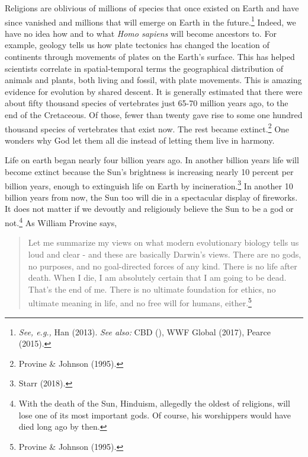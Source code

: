 \begin{multicols}{2}
Religions are oblivious of millions of species that once existed on Earth and have since vanished and millions that will emerge on Earth in the future.\footnote{\textit{See, e.g.,} Han (2013). \textit{See also:} CBD (), WWF Global (2017), Pearce (2015).} Indeed, we have no idea how and to what \textit{Homo sapiens} will become ancestors to. For example, geology tells us how plate tectonics has changed the location of continents through movements of plates on the Earth's surface. This has helped scientists correlate in spatial-temporal terms the geographical distribution of animals and plants, both living and fossil, with plate movements. This is amazing evidence for evolution by shared descent. It is generally estimated that there were about fifty thousand species of vertebrates just 65-70 million years ago, to the end of the Cretaceous. Of those, fewer than twenty gave rise to some one hundred thousand species of vertebrates that exist now. The rest became extinct.\footnote{Provine \& Johnson (1995).}  One wonders why God let them all die instead of letting them live in harmony.

Life on earth began nearly four billion years ago. In another billion years life will become extinct because the Sun's brightness is increasing nearly 10 percent per billion years, enough to extinguish life on Earth by incineration.\footnote{Starr (2018).} In another 10 billion years from now, the Sun too will die in a spectacular display of fireworks. It does not matter if we devoutly and religiously believe the Sun to be a god or not.\footnote{With the death of the Sun, Hinduism, allegedly the oldest of religions, will lose one of its most important gods. Of course, his worshippers would have died long ago by then.} As William Provine says,

\begin{quote}
Let me summarize my views on what modern evolutionary biology tells us loud and clear - and these are basically Darwin's views. There are no gods, no purposes, and no goal-directed forces of any kind. There is no life after death. When I die, I am absolutely certain that I am going to be dead. That's the end of me. There is no ultimate foundation for ethics, no ultimate meaning in life, and no free will for humans, either.\footnote{Provine \& Johnson (1995).}
\end{quote}


\end{multicols}
